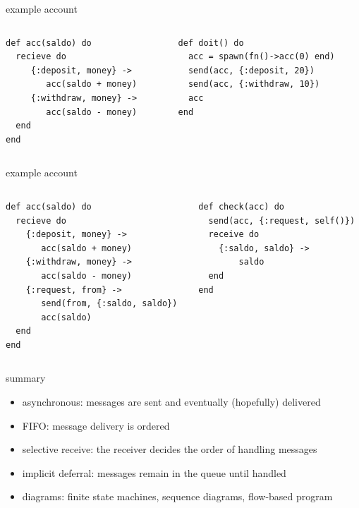 \begin{frame}[fragile]{example account}

\begin{columns}
   \begin{column}{.5\linewidth}
     \begin{verbatim}
def acc(saldo) do
  recieve do
     {:deposit, money} ->
        acc(saldo + money)
     {:withdraw, money} ->
        acc(saldo - money)
  end
end
     \end{verbatim}
   \end{column}
\pause
  \begin{column}{.5\linewidth}
     \begin{verbatim}
def doit() do
  acc = spawn(fn()->acc(0) end)
  send(acc, {:deposit, 20})
  send(acc, {:withdraw, 10})
  acc
end
     \end{verbatim}
   \end{column}
\end{columns}


\end{frame}

\begin{frame}[fragile]{example account}

\begin{columns}
   \begin{column}{.45\linewidth}
\begin{verbatim}
def acc(saldo) do
  recieve do
    {:deposit, money} ->
       acc(saldo + money)
    {:withdraw, money} ->
       acc(saldo - money)
    {:request, from} ->
       send(from, {:saldo, saldo})
       acc(saldo)
  end
end
\end{verbatim}
\end{column}
\pause
   \begin{column}{.45\linewidth}
\begin{verbatim}
def check(acc) do
  send(acc, {:request, self()})
  receive do
    {:saldo, saldo} ->
        saldo
  end
end
\end{verbatim}
\end{column}
\end{columns}
\end{frame}

\begin{frame}{summary}

\begin{itemize}
\item asynchronous: messages are sent and eventually (hopefully) delivered
\item FIFO: message delivery is ordered
\item selective receive: the receiver decides the order of handling messages
\item implicit deferral: messages remain in the queue until handled
\item diagrams: finite state machines, sequence diagrams, flow-based program
\end{itemize}

\end{frame}






